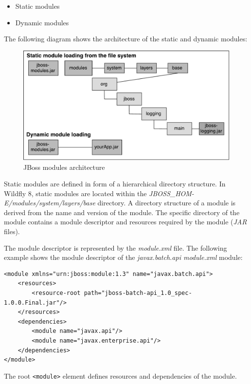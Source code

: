\documentclass[12pt,oneside]{fithesis2}
\begin{document}
\begin{itemize}
	\item Static modules
	\item Dynamic modules
\end{itemize}

The following diagram shows the architecture of the static and dynamic modules:

\begin{figure}[ht!]
	\centering
	\includegraphics[width=\textwidth]{images/jboss_modules}
	\caption{JBoss modules architecture \cite{wildfly_book}}
	\label{jboss_modules_image}
\end{figure}

Static modules are defined in form of a hierarchical directory structure. In Wildfly 8, static modules are located within the \textit{JBOSS\_HOM-E/modules/system/layers/base} directory. A directory structure of a module is derived from the name and version of the module. The specific directory of the module contains a module descriptor and resources required by the module (\textit{JAR} files).

The module descriptor is represented by the \textit{module.xml} file. The following example shows the module descriptor of the \textit{javax.batch.api module.xml} module:
\begin{lstlisting}[caption =  An example of a module descriptor \cite{wildfly_book}, label = module_descriptor, style=my_xml]
<module xmlns="urn:jboss:module:1.3" name="javax.batch.api">
	<resources>
		<resource-root path="jboss-batch-api_1.0_spec-1.0.0.Final.jar"/>
	</resources>
	<dependencies>
		<module name="javax.api"/>
		<module name="javax.enterprise.api"/>
	</dependencies>    
</module>
\end{lstlisting}
\noindent	
The root \verb|<module>| element defines resources and dependencies of the module. 
\end{document}
